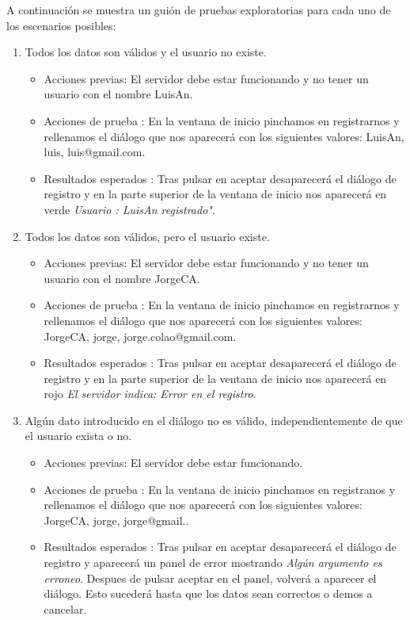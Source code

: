 A continuación se muestra un guión de pruebas exploratorias para cada uno de los escenarios posibles:
\begin{enumerate} 
\item Todos los datos son válidos y el usuario no existe.
	\begin{itemize}
	\item Acciones previas: El servidor debe estar funcionando y no tener un usuario con el nombre LuisAn.
	\item Acciones de prueba : En la ventana de inicio pinchamos en registrarnos y rellenamos el diálogo que nos aparecerá con los siguientes valores: LuisAn, luis, luis@gmail.com.
	\item Resultados esperados : Tras pulsar en aceptar  desaparecerá el diálogo de registro y en la parte superior de la ventana de inicio nos aparecerá en verde \emph {Usuario : LuisAn registrado"}.
	\end{itemize}
\item Todos los datos son válidos, pero el usuario existe.
	\begin{itemize}
	\item Acciones previas: El servidor debe estar funcionando y no tener un usuario con el nombre JorgeCA.
	\item Acciones de prueba : En la ventana de inicio pinchamos en registrarnos y rellenamos el diálogo que nos aparecerá con los siguientes valores: JorgeCA, jorge, jorge.colao@gmail.com.
	\item Resultados esperados : Tras pulsar en aceptar desaparecerá el diálogo de registro y en la parte superior de la ventana de inicio nos aparecerá en rojo \emph {El servidor indica: Error en el registro}.
	\end{itemize}

\item Algún dato introducido en el diálogo no es válido, independientemente de que el usuario exista o no.
	\begin{itemize}
	\item Acciones previas: El servidor debe estar funcionando.
	\item Acciones de prueba : En la ventana de inicio pinchamos en registranos y rellenamos el diálogo que nos aparecerá con los siguientes valores: JorgeCA, jorge, jorge@gmail..
	\item Resultados esperados : Tras pulsar en aceptar desaparecerá el diálogo de registro y aparecerá un panel de error mostrando \emph{Algún argumento es erroneo}. Despues de pulsar aceptar en el panel, volverá a aparecer el diálogo. Esto sucederá hasta que los datos sean correctos o demos a cancelar.  
	\end{itemize}
\end{enumerate} 
